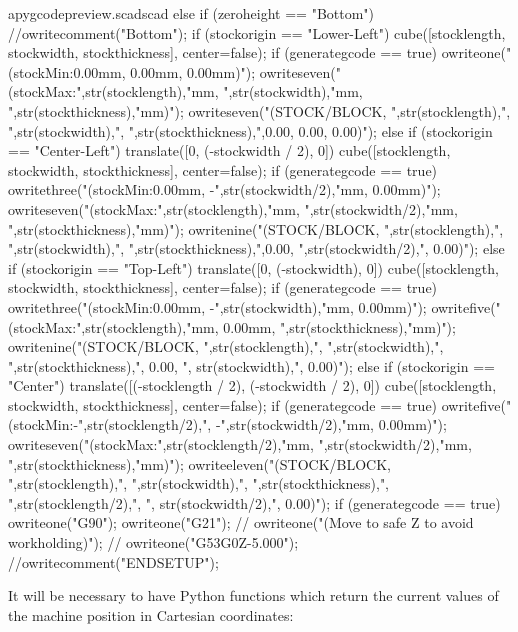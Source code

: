 \documentclass{ltxdoc}
\begin{document}
\begin{writecode}{a}{pygcodepreview.scad}{scad}
{{{{{      }
    }
  }
} else if (zeroheight == "Bottom") {
//owritecomment("Bottom");
    if (stockorigin == "Lower-Left") {
    cube([stocklength, stockwidth, stockthickness], center=false);
if (generategcode == true) {
owriteone("(stockMin:0.00mm, 0.00mm, 0.00mm)");
owriteseven("(stockMax:",str(stocklength),"mm, ",str(stockwidth),"mm, ",str(stockthickness),"mm)");
owriteseven("(STOCK/BLOCK, ",str(stocklength),", ",str(stockwidth),", ",str(stockthickness),",0.00, 0.00, 0.00)");
    }
}    else if (stockorigin == "Center-Left") {
    translate([0, (-stockwidth / 2), 0]){
      cube([stocklength, stockwidth, stockthickness], center=false);
if (generategcode == true) {
owritethree("(stockMin:0.00mm, -",str(stockwidth/2),"mm, 0.00mm)");
owriteseven("(stockMax:",str(stocklength),"mm, ",str(stockwidth/2),"mm, ",str(stockthickness),"mm)");
owritenine("(STOCK/BLOCK, ",str(stocklength),", ",str(stockwidth),", ",str(stockthickness),",0.00, ",str(stockwidth/2),", 0.00)");
    }
  } 
    } else if (stockorigin == "Top-Left") {
    translate([0, (-stockwidth), 0]){
      cube([stocklength, stockwidth, stockthickness], center=false);
    }
if (generategcode == true) {
owritethree("(stockMin:0.00mm, -",str(stockwidth),"mm, 0.00mm)");
owritefive("(stockMax:",str(stocklength),"mm, 0.00mm, ",str(stockthickness),"mm)");
owritenine("(STOCK/BLOCK, ",str(stocklength),", ",str(stockwidth),", ",str(stockthickness),", 0.00, ", str(stockwidth),", 0.00)");
  }
}    else if (stockorigin == "Center") {
    translate([(-stocklength / 2), (-stockwidth / 2), 0]){
      cube([stocklength, stockwidth, stockthickness], center=false);
    }
if (generategcode == true) {
owritefive("(stockMin:-",str(stocklength/2),", -",str(stockwidth/2),"mm, 0.00mm)");
owriteseven("(stockMax:",str(stocklength/2),"mm, ",str(stockwidth/2),"mm, ",str(stockthickness),"mm)");
owriteeleven("(STOCK/BLOCK, ",str(stocklength),", ",str(stockwidth),", ",str(stockthickness),", ",str(stocklength/2),", ", str(stockwidth/2),", 0.00)");
    }
  }
}
if (generategcode == true) {
    owriteone("G90");
    owriteone("G21");
//    owriteone("(Move to safe Z to avoid workholding)");
//    owriteone("G53G0Z-5.000");
  }
//owritecomment("ENDSETUP");
}

\end{writecode}
\addtocounter{pyscad}{93}

It will be necessary to have Python functions which return the current values of the 
machine position in Cartesian coordinates: 
\end{document}
